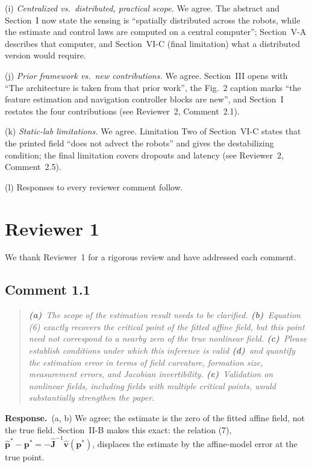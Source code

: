 \documentclass[10pt]{article}
\newcommand{\resp}{\par\textbf{Response.}~}
\begin{document}
(i) \emph{Centralized vs.\ distributed, practical scope.} We agree. The abstract and Section~I now state the sensing is ``spatially distributed across the robots, while the estimate and control laws are computed on a central computer''; Section~V-A describes that computer, and Section~VI-C (final limitation) what a distributed version would require.

(j) \emph{Prior framework vs.\ new contributions.} We agree. Section~III opens with ``The architecture is taken from that prior work'', the Fig.~2 caption marks ``the feature estimation and navigation controller blocks are new'', and Section~I restates the four contributions (see Reviewer~2, Comment~2.1).

(k) \emph{Static-lab limitations.} We agree. Limitation Two of Section~VI-C states that the printed field ``does not advect the robots'' and gives the destabilizing condition; the final limitation covers dropouts and latency (see Reviewer~2, Comment~2.5).

(l) Responses to every reviewer comment follow.

\section*{Reviewer 1}

We thank Reviewer~1 for a rigorous review and have addressed each comment.

\subsection*{Comment 1.1}

\begin{quote}\itshape
\textbf{(a)}~The scope of the estimation result needs to be clarified.
\textbf{(b)}~Equation (6) exactly recovers the critical point of the fitted affine field, but this point need not correspond to a nearby zero of the true nonlinear field.
\textbf{(c)}~Please establish conditions under which this inference is valid
\textbf{(d)}~and quantify the estimation error in terms of field curvature, formation size, measurement errors, and Jacobian invertibility.
\textbf{(e)}~Validation on nonlinear fields, including fields with multiple critical points, would substantially strengthen the paper.
\end{quote}

\resp (a, b) We agree; the estimate is the zero of the fitted affine field, not the true field. Section~II-B makes this exact: the relation (7), $\hat{\mathbf{p}}^* - \mathbf{p}^* = -\hat{\mathbf{J}}^{-1}\hat{\mathbf{v}}(\mathbf{p}^*)$, displaces the estimate by the affine-model error at the true point.
\end{document}
